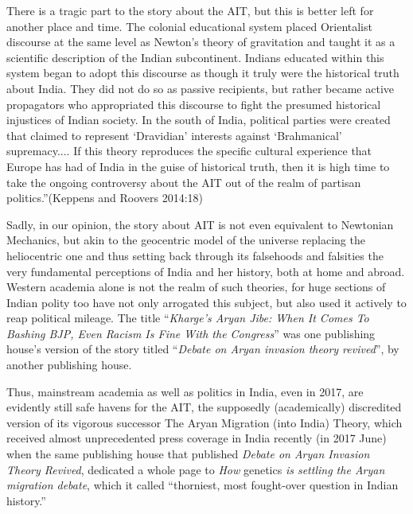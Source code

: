 \vskip 4pt

\begin{myquote}
There is a tragic part to the story about the AIT, but this is better left for another place and time. The colonial educational system placed Orientalist discourse at the same level as Newton’s theory of gravitation and taught it as a scientific description of the Indian subcontinent. Indians educated within this system began to adopt this discourse as though it truly were the historical truth about India. They did not do so as passive recipients, but rather became active propagators who appropriated this discourse to fight the presumed historical injustices of Indian society. In the south of India, political parties were created that claimed to represent ‘Dravidian’ interests against ‘Brahmanical’ supremacy.... If this theory reproduces the specific cultural experience that Europe has had of India in the guise of historical truth, then it is high time to take the ongoing controversy about the AIT out of the realm of partisan politics.”\hfill (Keppens and Roovers 2014:18)
\end{myquote}

\vskip 4pt

Sadly, in our opinion, the story about AIT is not even equivalent to Newtonian Mechanics, but akin to the geocentric model of the universe replacing the heliocentric one and thus setting back through its falsehoods and falsities the very fundamental perceptions of India and her history, both at home and abroad. Western academia alone is not the realm of such theories, for huge sections of Indian polity too have not only arrogated this subject, but also used it actively to reap political mileage. The title “\textit{Kharge’s Aryan Jibe: When It Comes To Bashing BJP, Even Racism Is Fine With the Congress}” was one publishing house’s version of the story titled “\textit{Debate on Aryan invasion theory revived}”, by another publishing house.

Thus, mainstream academia as well as politics in India, even in 2017, are evidently still safe havens for the AIT, the supposedly (academically) discredited version of its vigorous successor The Aryan Migration (into India) Theory, which received almost unprecedented press coverage in India recently (in 2017 June) when the same publishing house that published \textit{Debate on Aryan Invasion Theory Revived}, dedicated a whole page to \textit{How }genetics\textit{ is settling the Aryan migration debate}, which it called “thorniest, most fought-over question in Indian history.” 

